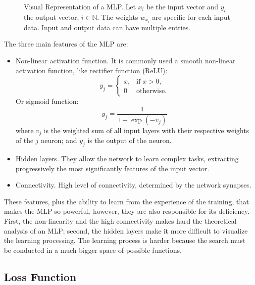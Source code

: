 \begin{figure}[!htb]
    \centering
    \caption[Visual Representation of a MLP]{Visual Representation of a MLP. Let \(x_i\) be the input vector and \(y_i\) the output vector, \(i \in \mathbb{N}\). The weights \(w_{x_i}\) are specific for each input data. Input and output data can have multiple entries.}
    
    
    \label{fig:mlp}
\end{figure}

The three main features of the MLP are:
%
\begin{itemize}
    \item Non-linear activation function. It is commonly used a smooth non-linear activation function, like rectifier function (ReLU):
    \begin{equation}
        y_j = \left\{%
        \begin{array}{ll}
            x, & \text{if } x > 0, \\
            0  & \text{otherwise.}
        \end{array} \right.
    \end{equation}
    Or sigmoid function:
    \begin{equation}
        y_j = \frac{1}{1+\exp(-v_j)}
        \label{eq:sigmoid_function}
    \end{equation}
    where \(v_j\) is the weighted sum of all input layers with their respective weights of the \(j\) neuron; and \(y_j\) is the output of the neuron.
    \item Hidden layers. They allow the network to learn complex tasks, extracting progressively the most significantly features of the input vector.
    \item Connectivity. High level of connectivity, determined by the network synapses.
\end{itemize}

These features, plus the ability to learn from the experience of the training, that makes the MLP so powerful, however, they are also responsible for its deficiency. 
First, the non-linearity and the high connectivity makes hard the theoretical analysis of an MLP; second, the hidden layers make it more difficult to visualize the learning processing. 
The learning process is harder because the search must be conducted in a much bigger space of possible functions.

\subsection{Loss Function}\label{sec:loss_function}

